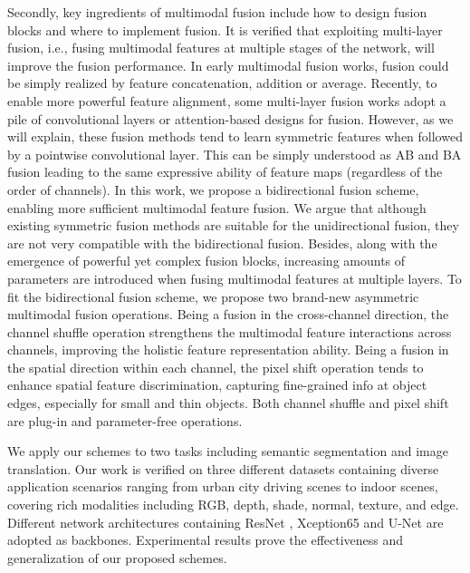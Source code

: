 \documentclass[sigconf]{acmart}
\begin{document}
Secondly, key ingredients of multimodal fusion include how to design fusion blocks and where to implement fusion. It is verified that exploiting multi-layer fusion, i.e., fusing multimodal features at multiple stages of the network, will improve the fusion performance. In early multimodal fusion works, fusion could be simply realized by feature concatenation, addition or average.  Recently, to enable more powerful feature alignment, some multi-layer fusion works adopt a pile of  convolutional layers \cite{DBLP:conf/iccv/LeePH17} or attention-based designs \cite{DBLP:journals/ijcv/RussakovskyDSKS15} for fusion. 
However, as we will explain, these fusion methods tend to learn symmetric features when followed by a pointwise convolutional layer. This can be simply understood as AB and BA fusion leading to the same expressive ability of feature maps (regardless of the order of channels). In this work, we propose a bidirectional fusion scheme, enabling more sufficient multimodal feature fusion. We argue that although existing symmetric fusion methods are suitable for the unidirectional fusion, they are not very compatible with the bidirectional fusion. Besides, along with the emergence of powerful yet complex fusion blocks, increasing amounts of parameters are introduced when fusing multimodal features at multiple layers. To fit the bidirectional fusion scheme, we propose two brand-new asymmetric multimodal fusion operations. Being a fusion in the cross-channel direction, the channel shuffle operation strengthens the multimodal feature interactions across channels, improving the holistic feature representation ability. Being a fusion in the spatial direction within each channel, the pixel shift operation tends to enhance spatial feature discrimination, capturing fine-grained info at object edges, especially for small and thin objects. Both channel shuffle and pixel shift are plug-in and parameter-free operations. 

We apply our schemes to two tasks including semantic segmentation and image translation. Our work is verified on three different datasets containing diverse application scenarios ranging from urban city driving scenes to indoor scenes, covering rich modalities  including RGB, depth, shade, normal, texture, and edge. Different network architectures containing ResNet \cite{DBLP:conf/cvpr/HeZRS16}, Xception65 \cite{DBLP:conf/cvpr/Chollet17} and U-Net \cite{DBLP:conf/miccai/RonnebergerFB15} are adopted as backbones.  Experimental results prove the effectiveness and generalization of our proposed schemes. 
\end{document}
